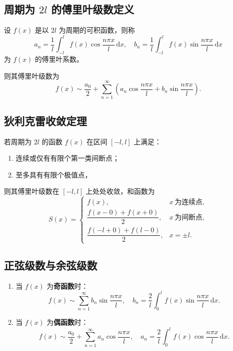 \subsection{周期为 $2l$ 的傅里叶级数定义}

设 $f(x)$ 是以 $2l$ 为周期的可积函数，则称
\[
    a_n = \frac{1}{l}\int_{-l}^{l} f(x)\cos\frac{n\pi x}{l}\,\mathrm{d}x, \quad
    b_n = \frac{1}{l}\int_{-l}^{l} f(x)\sin\frac{n\pi x}{l}\,\mathrm{d}x
\]
为 $f(x)$ 的傅里叶系数。

则其傅里叶级数为
\[
    f(x) \sim \frac{a_0}{2}
    + \sum_{n=1}^{\infty}\left(a_n\cos\frac{n\pi x}{l}
    + b_n\sin\frac{n\pi x}{l}\right).
\]

\subsection{狄利克雷收敛定理}

若周期为 $2l$ 的函数 $f(x)$ 在区间 $[-l,l]$ 上满足：

\begin{enumerate}
    \item 连续或仅有有限个第一类间断点；
    \item 至多具有有限个极值点，
\end{enumerate}

则其傅里叶级数在 $[-l,l]$ 上处处收敛，和函数为
\[
    S(x) =
    \begin{cases}
        f(x),                      & x\ \text{为连续点}, \\[0.4em]
        \dfrac{f(x-0)+f(x+0)}{2},  & x\ \text{为间断点}, \\[0.8em]
        \dfrac{f(-l+0)+f(l-0)}{2}, & x = \pm l.
    \end{cases}
\]
\subsection{正弦级数与余弦级数}

\begin{enumerate}
    \item 当 $f(x)$ 为\textbf{奇函数}时：
          \[
              f(x) \sim \sum_{n=1}^{\infty} b_n \sin\frac{n\pi x}{l},
              \quad b_n = \frac{2}{l}\int_0^l f(x)\sin\frac{n\pi x}{l}\,\mathrm{d}x.
          \]

    \item 当 $f(x)$ 为\textbf{偶函数}时：
          \[
              f(x) \sim \frac{a_0}{2}
              + \sum_{n=1}^{\infty} a_n \cos\frac{n\pi x}{l},
              \quad a_n = \frac{2}{l}\int_0^l f(x)\cos\frac{n\pi x}{l}\,\mathrm{d}x.
          \]
\end{enumerate}

